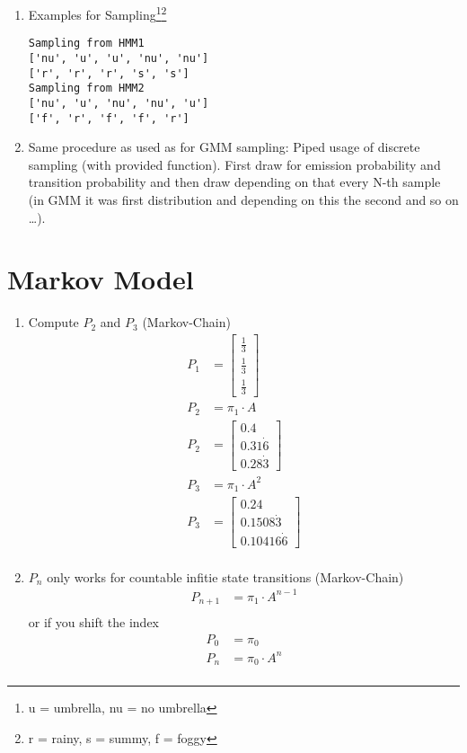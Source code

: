 \documentclass[12pt,a4paper]{article}
\begin{document}
\begin{enumerate}[label*={\arabic*.}]
  \item Examples for Sampling\footnote{u = umbrella, nu = no
  umbrella}\footnote{r = rainy, s = summy, f = foggy}
  \begin{verbatim}
Sampling from HMM1
['nu', 'u', 'u', 'nu', 'nu']
['r', 'r', 'r', 's', 's']
Sampling from HMM2
['nu', 'u', 'nu', 'nu', 'u']
['f', 'r', 'f', 'f', 'r']
  \end{verbatim}
  \item Same procedure as used as for GMM sampling: Piped usage of discrete
  sampling (with provided function). First draw for emission probability and
  transition probability and then draw depending on that every N-th sample (in
  GMM it was first distribution and depending on this the second and so on
  \ldots).
\end{enumerate}

\newpage
\section{Markov Model}

\begin{enumerate}[label*={\arabic*.}]
  \item Compute $P_2$ and $P_3$ (Markov-Chain)
    \begin{align*}
P_1 &=
\begin{bmatrix}
\frac{1}{3}\\
\frac{1}{3}\\
\frac{1}{3}
\end{bmatrix}\\
P_2 &= \pi_1 \cdot A\\
P_2 &= 
\begin{bmatrix}
0.4\\
0.31\dot6\\
0.28\dot3
\end{bmatrix}\\
P_3 &= \pi_1 \cdot A^2\\
P_3 &= 
\begin{bmatrix}
0.24\\
0.1508\dot3\\
0.10416\dot6
\end{bmatrix}\\
\end{align*}
  \item $P_n$ only works for countable infitie state transitions (Markov-Chain)
\begin{align*}
P_{n+1} &= \pi_1 \cdot A^{n-1}\\
\end{align*}
or if you shift the index
\begin{align*}
P_0 &= \pi_0\\
P_n &= \pi_0 \cdot A^{n}\\
\end{align*}
\end{enumerate}

\newpage
\printbibliography
\end{document}
